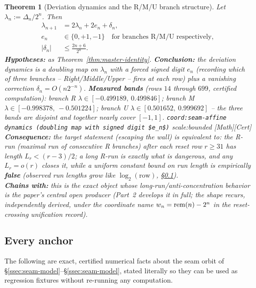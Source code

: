 \documentclass[11pt]{article}
\theoremstyle{plain}
\newtheorem{thm}{Theorem}[section]
\theoremstyle{definition}
\theoremstyle{remark}
\let\origmathrm\mathrm
\renewcommand{\mathrm}[1]{\ifmmode\origmathrm{#1}\else\textrm{#1}\fi}%
\newcommand{\ev}[1]{{\small\textsf{[#1]}}\xspace}
\newcommand{\scale}[1]{{\small\textsf{scale:#1}}\xspace}
\newcommand{\coord}[1]{\texorpdfstring{{\small\nolinkurl{coord:#1}}}{coord:#1}\xspace}
\begin{document}
\begin{thm}[Deviation dynamics and the R/M/U branch structure]
\label{thm:dynamics}
Let $\lambda_n := \Delta_n / 2^n$. Then
\begin{equation*}
\begin{aligned}
\lambda_{n+1} &= 2\lambda_n + 2e_n + \delta_n,\\
e_n &\in \{0,+1,-1\}\quad\text{for branches R/M/U respectively},\\
|\delta_n| &\le \frac{2n+6}{2^n}.
\end{aligned}
\tag{III}
\end{equation*}
\textbf{Hypotheses:} as Theorem~\ref{thm:master-identity}. \textbf{Conclusion:} the deviation
dynamics is a doubling map on $\lambda_n$ with a forced signed digit $e_n$ (recording which of three
branches -- Right/Middle/Upper -- fires at each row) plus a vanishing correction $\delta_n = O(n
2^{-n})$. \textbf{Measured bands} (rows $14$ through $699$, certified computation): branch R
$\lambda \in [-0.499189,\ 0.499846]$; branch M $\lambda \in [-0.998378,\ -0.501224]$; branch U
$\lambda \in [0.501652,\ 0.999692]$ -- the three bands are disjoint and together nearly cover
$[-1,1]$. \coord{seam-affine dynamics (doubling map with signed digit $e_n$)} \scale{bounded}
\ev{Math}\ev{Cert}\\
\textbf{Consequence:} the target statement (escaping the wall) is equivalent to: the R-run (maximal
run of consecutive R branches) after each reset row $r \ge 31$ has length $L_r < (r-3)/2$; a long
R-run is exactly what is dangerous, and any $L_r = o(r)$ closes it, while a \emph{uniform} constant
bound on run length is empirically \textbf{false} (observed run lengths grow like
$\log_2(\text{row})$, \S\ref{ssec:anchors}).\\
\textbf{Chains with:} this is the exact object whose long-run/anti-concentration behavior is the
paper's central open producer (Part~2 develops it in full; the shape recurs, independently derived,
under the coordinate name $w_n = \mathrm{rem}(n) - 2^n$ in the reset-crossing unification record).
\end{thm}

\subsection{Every anchor}
\label{ssec:anchors}

The following are exact, certified numerical facts about the seam orbit of
\S\ref{ssec:seam-model}--\S\ref{ssec:seam-model}, stated literally so they can be used as
regression fixtures without re-running any computation.
\end{document}
